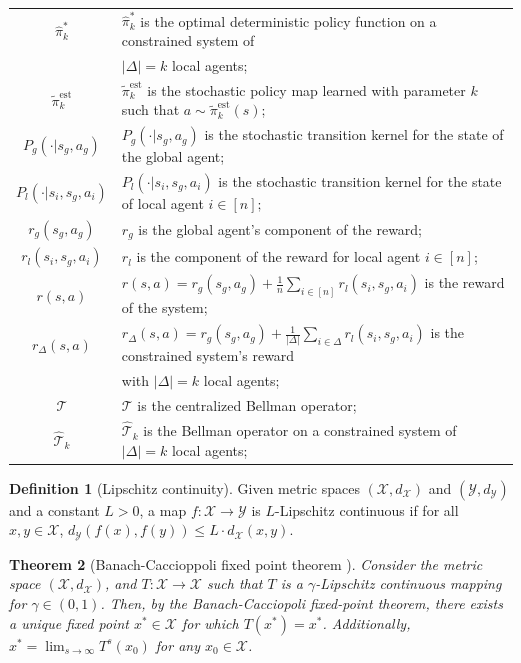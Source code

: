 \documentclass{article}
\theoremstyle{plain}
\newtheorem{theorem}{Theorem}[section]
\theoremstyle{definition}
\newtheorem{definition}[theorem]{Definition}
\def\est{\mathrm{est}}
\begin{document}
\begin{table}[hbt!]
\begin{tabular}{c|l}
    $\hat{\pi}_k^*$ & $\hat{\pi}_k^*$ is the optimal deterministic policy function on a constrained system of \\ & \quad\quad $|\Delta|=k$ local agents; \\
    $\tilde{\pi}^\est_k$ & $\tilde{\pi}^\est_k$ is the stochastic policy map learned with parameter $k$ such that $a\sim\tilde{\pi}_k^\est(s)$;\\ 
    $P_g(\cdot|s_g,a_g)$ & $P_g(\cdot|s_g,a_g)$ is the stochastic transition kernel for the state of the global agent; \\ 
    $P_l(\cdot|s_i,s_g, a_i)$ & $P_l(\cdot|s_i,s_g, a_i)$ is the stochastic transition kernel for the state of local agent $i\in[n];$\\  
    $r_g(s_g,a_g)$ & $r_g$ is the global agent's component of the reward;\\
    $r_l(s_i,s_g,a_i)$ & $r_l$ is the component of the reward for local agent $i\in[n]$;\\
    $r(s,a)$ & $r(s,a) = r_g(s_g,a_g)+\frac{1}{n}\sum_{i\in[n]}r_l(s_i,s_g,a_i)$ is the reward of the system; \\
    $r_\Delta(s,a)$ & $r_\Delta(s,a) = r_g(s_g,a_g)+\frac{1}{|\Delta|}\sum_{i\in\Delta}r_l(s_i,s_g,a_i)$ is the constrained system's reward\\ &\quad\quad with $|\Delta|=k$ local agents;\\
    $\mathcal{T}$ & $\mathcal{T}$ is the centralized Bellman operator;\\
    $\hat{\mathcal{T}}_k$ & $\hat{\mathcal{T}}_k$ is the Bellman operator on a constrained system of $|\Delta|=k$ local agents;\\    \hline
  \end{tabular}
\end{table}


\begin{definition}[Lipschitz continuity] Given metric spaces $(\mathcal{X}, d_\mathcal{X})$ and $(\mathcal{Y}, d_\mathcal{Y})$ and a constant $L>0$, a map $f:\mathcal{X}\to \mathcal{Y}$ is $L$-Lipschitz continuous if for all $x,y\in \mathcal{X}$, $
    d_\mathcal{Y}(f(x), f(y)) \leq L \cdot  d_\mathcal{X}(x,y)$.
\end{definition} 

\begin{theorem}[Banach-Caccioppoli fixed point theorem \citep{Banach1922}]
Consider the metric space $(\mathcal{X}, d_\mathcal{X})$, and $T: \mathcal{X}\to \mathcal{X}$ such that $T$ is a $\gamma$-Lipschitz continuous mapping for $\gamma \in (0,1)$. Then, by the Banach-Cacciopoli fixed-point theorem, there exists a unique fixed point $x^* \in \mathcal{X}$ for which $T(x^*) = x^*$. Additionally, $x^* = \lim_{s\to\infty} T^s( x_0)$ for any $x_0 \in \mathcal{X}$.
\end{theorem}
\end{document}
